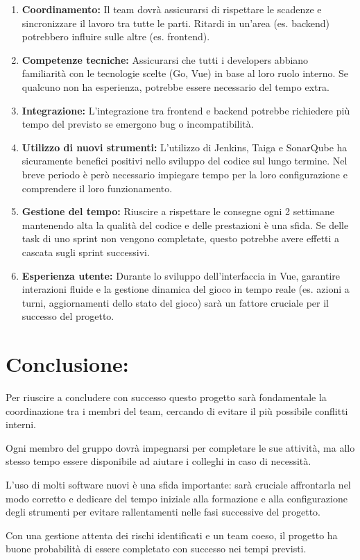 \documentclass{article}
\begin{document}
\begin{enumerate}
    \item \textbf{Coordinamento:} Il team dovrà assicurarsi di rispettare le 
      scadenze e sincronizzare il lavoro tra tutte le parti. Ritardi in un'area 
      (es. backend) potrebbero influire sulle altre (es. frontend).

   \item \textbf{Competenze tecniche:} Assicurarsi che tutti i developers 
     abbiano familiarità con le tecnologie scelte (Go, Vue) in base al loro 
     ruolo interno. Se qualcuno non ha esperienza, potrebbe essere necessario 
     del tempo extra.

   \item \textbf{Integrazione:} L'integrazione tra frontend e backend potrebbe 
     richiedere più tempo del previsto se emergono bug o incompatibilità.

   \item \textbf{Utilizzo di nuovi strumenti:} L'utilizzo di Jenkins, Taiga e 
     SonarQube ha sicuramente benefici positivi nello sviluppo del codice sul 
     lungo termine. Nel breve periodo è però necessario impiegare tempo per la 
     loro configurazione e comprendere il loro funzionamento.

   \item \textbf{Gestione del tempo:} Riuscire a rispettare le consegne ogni 2 
     settimane mantenendo alta la qualità del codice e delle prestazioni è una 
     sfida. Se delle task di uno sprint non vengono completate, questo potrebbe 
     avere effetti a cascata sugli sprint successivi.

   \item \textbf{Esperienza utente:} Durante lo sviluppo dell'interfaccia in Vue, 
     garantire interazioni fluide e la gestione dinamica del gioco in tempo reale 
     (es. azioni a turni, aggiornamenti dello stato del gioco) sarà un fattore 
     cruciale per il successo del progetto.
\end{enumerate}

\section{Conclusione:}
    Per riuscire a concludere con successo questo progetto sarà fondamentale la 
    coordinazione tra i membri del team, cercando di evitare il più possibile 
    conflitti interni.
    
    Ogni membro del gruppo dovrà impegnarsi per completare le sue attività, ma 
    allo stesso tempo essere disponibile ad aiutare i colleghi in caso di necessità.
    
    L'uso di molti software nuovi è una sfida importante: sarà cruciale 
    affrontarla nel modo corretto e dedicare del tempo iniziale alla formazione 
    e alla configurazione degli strumenti per evitare rallentamenti nelle fasi 
    successive del progetto.
    
    Con una gestione attenta dei rischi identificati e un team coeso, il progetto 
    ha buone probabilità di essere completato con successo nei tempi previsti.
\end{document}
